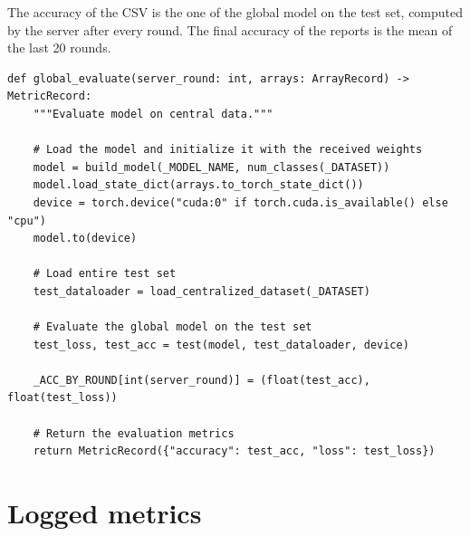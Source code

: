 \documentclass[11pt,a4paper]{article}
\begin{document}
The accuracy of the CSV is the one of the global model on the test set,
computed by the server after every round. The final accuracy of the reports is
the mean of the last 20 rounds.

\begin{lstlisting}[style=py,firstnumber=421,caption={\texttt{tesifl/tesiFL/server\_app.py}, lines 421--439}]
def global_evaluate(server_round: int, arrays: ArrayRecord) -> MetricRecord:
    """Evaluate model on central data."""

    # Load the model and initialize it with the received weights
    model = build_model(_MODEL_NAME, num_classes(_DATASET))
    model.load_state_dict(arrays.to_torch_state_dict())
    device = torch.device("cuda:0" if torch.cuda.is_available() else "cpu")
    model.to(device)

    # Load entire test set
    test_dataloader = load_centralized_dataset(_DATASET)

    # Evaluate the global model on the test set
    test_loss, test_acc = test(model, test_dataloader, device)

    _ACC_BY_ROUND[int(server_round)] = (float(test_acc), float(test_loss))

    # Return the evaluation metrics
    return MetricRecord({"accuracy": test_acc, "loss": test_loss})
\end{lstlisting}

\newpage
\section{Logged metrics}
\label{sec:metrics}
\end{document}
